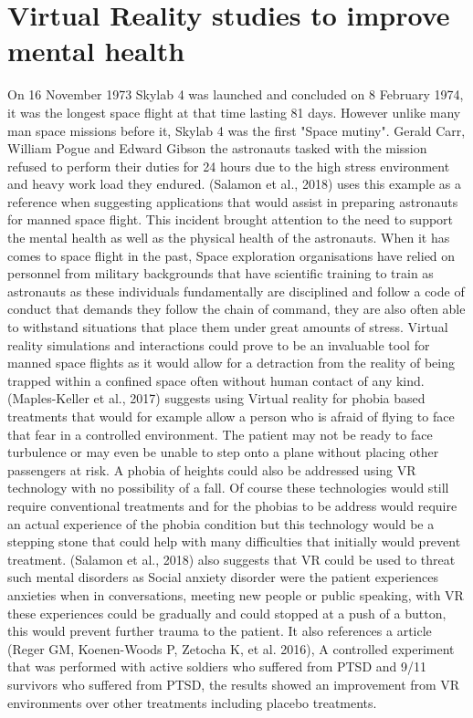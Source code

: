 \documentclass[10pt,journal,compsoc]{IEEEtran}
\begin{document}
	\section{Virtual Reality studies to improve mental health}
	 On 16 November 1973 Skylab 4 was launched and concluded on 8 February 1974, it was the longest space flight at that time lasting 81 days. However unlike many man space missions before it, Skylab 4 was the first "Space mutiny". Gerald Carr, William Pogue and Edward Gibson the astronauts tasked with the mission refused to perform their duties for 24 hours due to the high stress environment and heavy work load they endured. (Salamon et al., 2018) uses this example as a reference when suggesting applications that would assist in preparing astronauts for manned space flight. This incident brought attention to the need to support the mental health as well as the physical health of the astronauts. When it has comes to space flight in the past, Space exploration organisations have relied on personnel from military backgrounds that have scientific training to train as astronauts as these individuals fundamentally are disciplined and follow a code of conduct that demands they follow the chain of command, they are also often able to withstand situations that place them under great amounts of stress. Virtual reality simulations and interactions could prove to be an invaluable tool for manned space flights as it would allow for a detraction from the reality of being trapped within a confined space often without human contact of any kind. \newline \newline
	 (Maples-Keller et al., 2017) suggests using Virtual reality for phobia based treatments that would for example allow a person who is afraid of flying to face that fear in a controlled environment. The patient may not be ready to face turbulence or may even be unable to step onto a plane without placing other passengers at risk. A phobia of heights could also be addressed using VR technology with no possibility of a fall. Of course these technologies would still require conventional treatments and for the phobias to be address would require an actual experience of the phobia condition but this technology would be a stepping stone that could help with many difficulties that initially would prevent treatment. (Salamon et al., 2018) also suggests that VR could be used to threat such mental disorders as Social anxiety disorder were the patient experiences anxieties when in conversations, meeting new people or public speaking, with VR these experiences could be  gradually and could stopped at a push of a button, this would prevent further trauma to the patient. It also references a article (Reger GM, Koenen-Woods P, Zetocha K, et al. 2016), A controlled experiment that was performed with active soldiers who suffered from PTSD and 9/11 survivors who suffered from PTSD, the results showed an improvement from VR environments over other treatments including placebo treatments.
	
\end{document}
